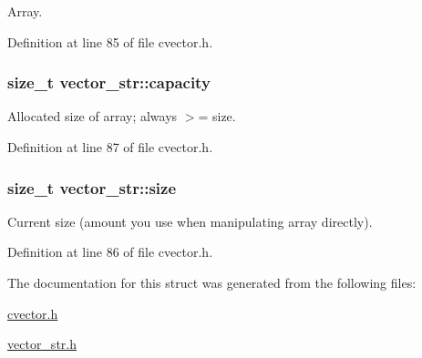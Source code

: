 Array. 



Definition at line 85 of file cvector.\-h.

\hypertarget{structvector__str_a8a52905a505acbcb9176be3eb6cf37f8}{
\subsubsection[{capacity}]{\setlength{\rightskip}{0pt plus 5cm}size\-\_\-t vector\-\_\-str\-::capacity}}\label{structvector__str_a8a52905a505acbcb9176be3eb6cf37f8}


Allocated size of array; always $>$= size. 



Definition at line 87 of file cvector.\-h.

\hypertarget{structvector__str_a63d4c1a5373481aa4ba9d4ee8252c748}{
\subsubsection[{size}]{\setlength{\rightskip}{0pt plus 5cm}size\-\_\-t vector\-\_\-str\-::size}}\label{structvector__str_a63d4c1a5373481aa4ba9d4ee8252c748}


Current size (amount you use when manipulating array directly). 



Definition at line 86 of file cvector.\-h.



The documentation for this struct was generated from the following files\-:\begin{DoxyCompactItemize}
\item 
\hyperlink{cvector_8h}{cvector.\-h}\item 
\hyperlink{vector__str_8h}{vector\-\_\-str.\-h}\end{DoxyCompactItemize}
